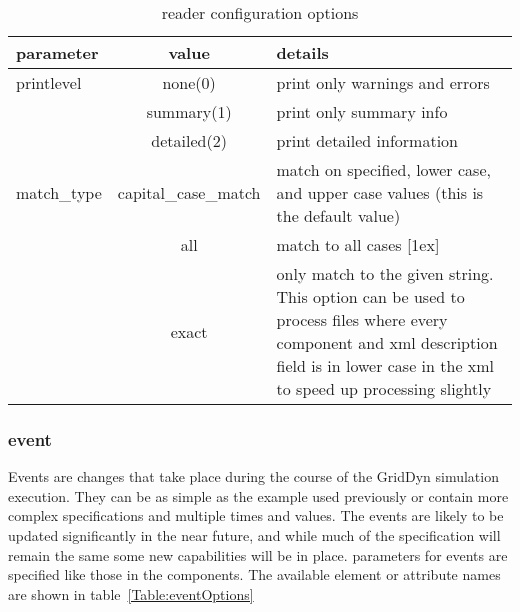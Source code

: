 \documentclass[12pt]{article} %
\begin{document}
 \begin{table}[ht]

     \caption{reader configuration options} %
     \centering %
     \begin{tabular}{l c p{8cm}} %
         \hline %
         parameter & value & details \\ [0.5ex] %
         \hline %
         printlevel & none(0) & print only warnings and errors \\ %
          & summary(1) & print only summary info \\
          & detailed(2) & print detailed information  \\
         match\_type & capital\_case\_match & match on specified, lower case, and upper case values (this is the default value) \\
         & all & match to all cases [1ex] \\
         & exact & only match to the given string.  This option can be used to process files where every component and xml description field is in lower case in the xml to speed up processing slightly \\%
         \hline %
     \end{tabular}
     \label{Table:configOptions}
 \end{table}

 \subsubsection{event}
 Events are changes that take place during the course of the GridDyn simulation execution.  They can be as simple as the example used previously or contain more complex specifications and multiple times and values.  The events are likely to be updated significantly in the near future, and while much of the specification will remain the same some new capabilities will be in place.
 parameters for events are specified like those in the components.  The available element or attribute names are shown in table~\ref{Table:eventOptions}
\end{document}

